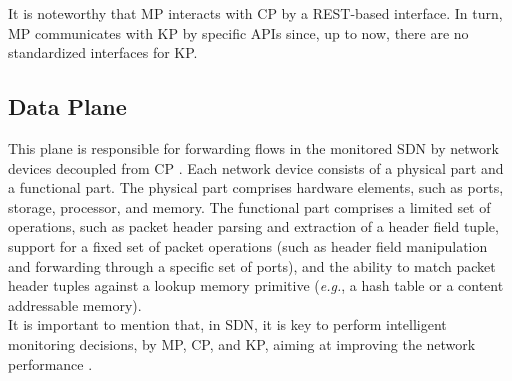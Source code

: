 It is noteworthy that MP interacts with CP by a REST-based interface. In turn, MP communicates with KP by specific APIs since, up to now, there are no standardized interfaces for KP.

\subsection{Data Plane}
This plane is responsible for forwarding flows in the monitored SDN by network devices decoupled from CP \cite{varghese2005network}. Each network device consists of a physical part and a functional part. The physical part comprises hardware elements, such as ports, storage, processor, and memory. The functional part comprises a limited set of operations, such as packet header parsing and extraction of a header field tuple, support for a fixed set of packet operations (such as header field manipulation and forwarding through a specific set of ports), and the ability to match packet header tuples against a lookup memory primitive (\textit{e.g.}, a hash table or a content addressable memory).\\

It is important to mention that, in SDN, it is key to perform intelligent monitoring decisions, by MP, CP, and KP, aiming at improving the network performance \cite{kreutz_2015:sdn_comprehensive_survey,isolani_2015:interactive, mestres_2017:KDN}.

